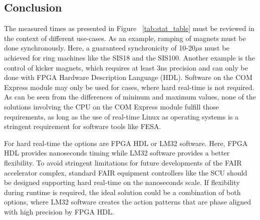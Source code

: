 \documentclass[25pt,halfparskip-,pagesize]{scrartcl}
\begin{document}
\begin{multicols*}{3}



\section{Conclusion}
The measured times as presented in Figure ~\ref{tab:stat_table}
must be reviewed in the context of different use-cases. As an example,
ramping of magnets must be done synchronously. Here, a guaranteed
synchronicity of 10-20$\mu$s must be achieved for ring machines like the
SIS18 and the SIS100. Another example is the control of kicker magnets,
which requires  at least 3ns precision and can only be done with FPGA
Hardware Description Language (HDL). Software on the COM Express module
may only be used for cases, where hard real-time is not required.
As can be seen from the differences of mininum and maximum values, none
of the solutions involving the CPU on the COM Express module fulfill
those requirements, as long as the use of real-time Linux as operating
systems is a stringent requirement for software tools like FESA.

For hard real-time the options are FPGA HDL or LM32 software. Here, FPGA
HDL provides nanoseconds timing while LM32 software provides a better
flexibility. To avoid stringent limitations for future developments of
the FAIR accelerator complex, standard FAIR equipment controllers like
the SCU should be designed supporting hard real-time on the nanoseconds
scale. If flexibility during runtime is required, the ideal solution
could be a combination of both options, where LM32 software creates the
action patterns that are phase aligned with high precision by FPGA HDL.


\vfill

\end{multicols*}
\end{document}
